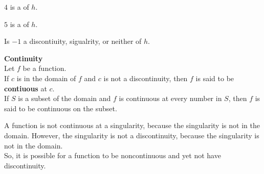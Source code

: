 \documentclass{ximera}
\begin{document}
\begin{example}
\begin{question}
$4$ is a  of $h$.


\end{question}





\begin{question}

$5$ is a  of $h$.


\end{question}





\begin{question}

Is $-1$ a discontiuity, sigualrity, or neither of $h$.

\begin{multipleChoice}
\end{multipleChoice}


\end{question}







\end{example}






\begin{definition} \textbf{\textcolor{green!50!black}{Continuity}} \\


Let $f$ be a function. \\
If $c$ is in the domain of $f$ and $c$ is not a discontinuity, then $f$ is said to be \textbf{contiuous} at $c$. \\


If $S$ is a subset of the domain and $f$ is continuous at every number in $S$, then $f$ is said to be continuous on the subset.


\end{definition}




\begin{warning}


A function is not continuous at a singularity, because the singularity is not in the domain.  However, the singularity is not a discontinuity, because the singularity is not in the domain. \\

So, it is possible for a function to be noncontinuous and yet not have discontinuity. 



\end{warning}
\end{document}
